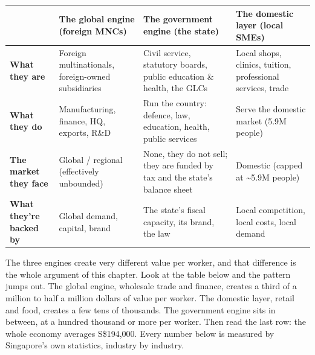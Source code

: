 \documentclass[10pt,twoside,openany]{memoir}
\renewcommand{\arraystretch}{1.1}
\begin{document}
{{{\def\LTcaptype{none} %
{\renewcommand{\arraystretch}{0.9}\begin{longtable}[]{@{}
  >{\raggedright\arraybackslash}p{}
  >{\raggedright\arraybackslash}p{}
  >{\raggedright\arraybackslash}p{}
  >{\raggedright\arraybackslash}p{}@{}}
\toprule\noalign{}
\begin{minipage}[b]{\linewidth}\raggedright
\end{minipage} & \begin{minipage}[b]{\linewidth}\raggedright
\textbf{The global engine} (foreign MNCs)
\end{minipage} & \begin{minipage}[b]{\linewidth}\raggedright
\textbf{The government engine} (the state)
\end{minipage} & \begin{minipage}[b]{\linewidth}\raggedright
\textbf{The domestic layer} (local SMEs)
\end{minipage} \\
\midrule\noalign{}
\endhead
\bottomrule\noalign{}
\endlastfoot
\textbf{What they are} & Foreign multinationals, foreign-owned
subsidiaries & Civil service, statutory boards, public education \&
health, the GLCs & Local shops, clinics, tuition, professional services,
trade \\
\textbf{What they do} & Manufacturing, finance, HQ, exports, R\&D & Run
the country: defence, law, education, health, public services & Serve
the domestic market (5.9M people) \\
\textbf{The market they face} & Global / regional (effectively
unbounded) & None, they do not sell; they are funded by tax and the
state's balance sheet & Domestic (capped at \textasciitilde5.9M
people) \\
\textbf{What they're backed by} & Global demand, capital, brand & The
state's fiscal capacity, its brand, the law & Local competition, local
costs, local demand \\
\end{longtable}
}

The three engines create very different value per worker, and that
difference is the whole argument of this chapter. Look at the table
below and the pattern jumps out. The global engine, wholesale trade and
finance, creates a third of a million to half a million dollars of value
per worker. The domestic layer, retail and food, creates a few tens of
thousands. The government engine sits in between, at a hundred thousand
or more per worker. Then read the last row: the whole economy averages
S\$194,000. Every number below is measured by Singapore's own
statistics, industry by industry.

}}}
\end{document}

